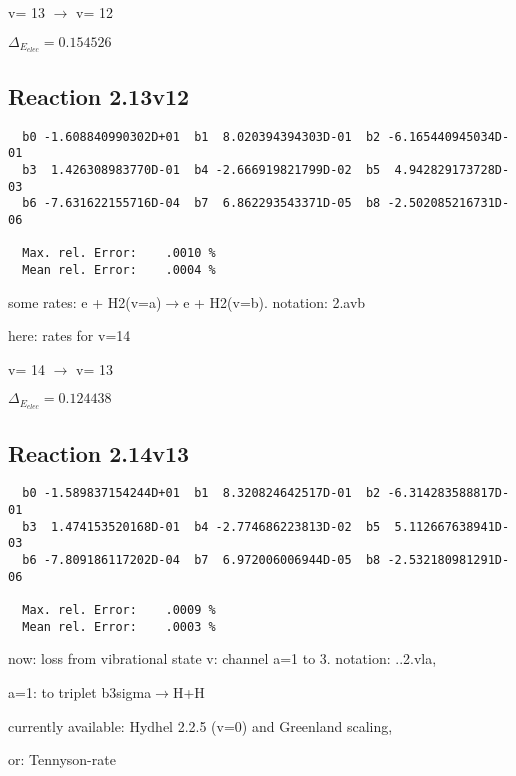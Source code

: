 \documentclass[12pt]{article}
\begin{document}
  v=  13 $\rightarrow$ v= 12

$\Delta_{E_{elec}}= 0.154526$


\subsection{
Reaction 2.13v12
}


\begin{small}\begin{verbatim}
  b0 -1.608840990302D+01  b1  8.020394394303D-01  b2 -6.165440945034D-01
  b3  1.426308983770D-01  b4 -2.666919821799D-02  b5  4.942829173728D-03
  b6 -7.631622155716D-04  b7  6.862293543371D-05  b8 -2.502085216731D-06

  Max. rel. Error:    .0010 %
  Mean rel. Error:    .0004 %

\end{verbatim}\end{small}

\newpage
some rates: e + H2(v=a)$\rightarrow$e + H2(v=b). notation: 2.avb

here: rates for v=14


  v=  14 $\rightarrow$ v= 13

$\Delta_{E_{elec}}= 0.124438$


\subsection{
Reaction 2.14v13
}


\begin{small}\begin{verbatim}
  b0 -1.589837154244D+01  b1  8.320824642517D-01  b2 -6.314283588817D-01
  b3  1.474153520168D-01  b4 -2.774686223813D-02  b5  5.112667638941D-03
  b6 -7.809186117202D-04  b7  6.972006006944D-05  b8 -2.532180981291D-06

  Max. rel. Error:    .0009 %
  Mean rel. Error:    .0003 %

\end{verbatim}\end{small}

\newpage

now: loss from vibrational state v: channel a=1 to 3. notation: ..2.vla,

a=1: to triplet b3sigma$\rightarrow$H+H

     currently available: Hydhel 2.2.5 (v=0) and Greenland scaling,

                      or: Tennyson-rate
\end{document}
